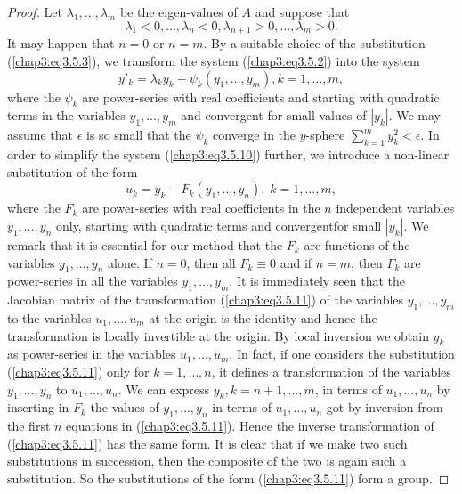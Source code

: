 \begin{proof}
Let $\lambda_1, \ldots, \lambda_m$ be the eigen-values of $A$ and
suppose that  
\begin{equation*}
\lambda_1 < 0, \ldots, \lambda_n < 0, \lambda_{n+1} > 0, \ldots, \lambda_m > 0. \tag{3.5.9}\label{chap3:eq3.5.9}
\end{equation*}
It may happen that $n=0$ or $n=m$. By a suitable choice of the
substitution (\ref{chap3:eq3.5.3}), we transform the system
(\ref{chap3:eq3.5.2}) into the system 
\begin{equation*}
y'_k = \lambda_k y_k + \psi_k (y_1 , \ldots, y_m), k = 1, \ldots, m,
\tag{3.5.10}\label{chap3:eq3.5.10} 
\end{equation*}
where the $\psi_k$ are power-series with real coefficients and
starting with quadratic terms in the variables $y_1, \ldots, y_m$ and
convergent for small values of $|y_k|$. We may assume that $\epsilon$
is so small that the $\psi_k$ converge in the $y$-sphere
$\sum\limits^m_{k=1} y^2_k < \epsilon$. In order to simplify the
system (\ref{chap3:eq3.5.10}) further, we introduce a non-linear
substitution of the form 
\begin{equation*}
u_k = y_k - F_k (y_1, \ldots, y_n), \; k = 1, \ldots, m, \tag{3.5.11}\label{chap3:eq3.5.11}
\end{equation*}
where the $F_k$ are power-series with real coefficients in the $n$
independent variables $y_1, \ldots, y_n$ only, starting with quadratic
terms and convergent\pageoriginale for small $|y_k|$. We remark that
it is essential for our method that the $F_k$ are functions of the
variables $y_1, \ldots, y_n$ alone. If $n=0$, then all $F_k \equiv 0$
and if $n=m$, then $F_k$ are power-series in all the variables $y_1,
\ldots, y_m$. It is immediately seen that the Jacobian matrix of the
transformation (\ref{chap3:eq3.5.11}) of the variables $y_1, \ldots,
y_m$ to the variables $u_1, \ldots, u_m$ at the origin is the identity
and hence the transformation is locally invertible at the origin. By
local inversion we obtain $y_k$ as power-series in the variables $u_1,
\ldots, u_m$. In fact, if one considers the substitution
(\ref{chap3:eq3.5.11}) only for $k = 1, \ldots,n$, it defines a
transformation of the variables $y_1, \ldots, y_n$ to $u_1, \ldots,
u_n$. We can express $y_k, k = n+ 1, \ldots, m$, in terms of $u_1,
\ldots, u_n$ by inserting in $F_k$ the values of $y_1, \ldots, y_n$ in
terms of $u_1, \ldots, u_n$ got by inversion from the first $n$
equations in (\ref{chap3:eq3.5.11}). Hence the inverse transformation
of (\ref{chap3:eq3.5.11}) has the same form. It is clear that if we
make two such substitutions in succession, then the composite of the
two is again such a substitution. So the substitutions of the form
(\ref{chap3:eq3.5.11}) form a group. 


\end{proof}
